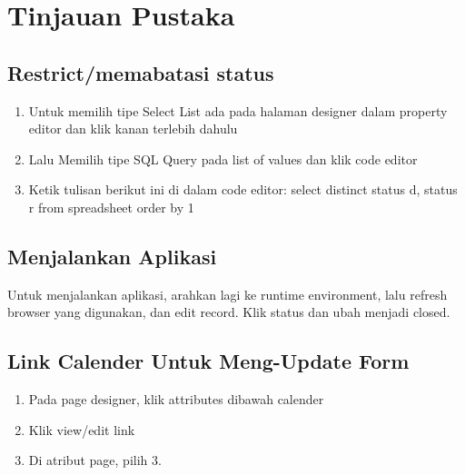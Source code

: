 \chapter{Tinjauan Pustaka}


\section{Restrict/memabatasi status}
\begin{enumerate}
    \item Untuk memilih tipe Select List ada pada halaman designer dalam property editor dan klik kanan terlebih dahulu
\item Lalu Memilih tipe SQL Query pada list of values dan klik code editor
\item Ketik tulisan berikut ini di dalam code editor:
select distinct status d, status r 
from spreadsheet
order by 1

\end{enumerate}


\section{Menjalankan Aplikasi}
\par Untuk menjalankan aplikasi, arahkan lagi ke runtime environment, lalu refresh browser yang digunakan, dan edit record. Klik status dan ubah menjadi closed.



 \section{Link Calender Untuk Meng-Update Form}
 \begin{enumerate}
     \item 	Pada page designer, klik attributes dibawah calender
 \item 	Klik view/edit link
 \item 	Di atribut page, pilih 3.

 \end{enumerate}


